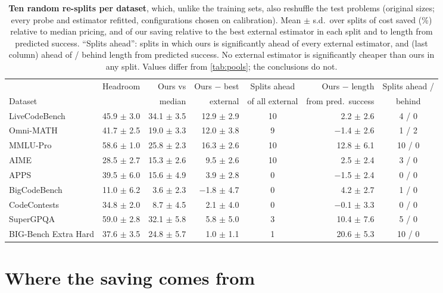 \documentclass[10pt]{article}
\begin{document}
\begin{table}[h]
\centering
\footnotesize
\setlength{\tabcolsep}{4pt}
\begin{tabular}{lrrrcrc}
\toprule
 & Headroom & Ours vs & Ours $-$ best & Splits ahead & Ours $-$ length & Splits ahead / \\
Dataset & & median & external & of all external & from pred.\ success & behind \\
\midrule
LiveCodeBench & 45.9 $\pm$ 3.0 & 34.1 $\pm$ 3.5 & 12.9 $\pm$ 2.9 & 10 & 2.2 $\pm$ 2.6 & 4 / 0 \\
Omni-MATH & 41.7 $\pm$ 2.5 & 19.0 $\pm$ 3.3 & 12.0 $\pm$ 3.8 & 9 & $-$1.4 $\pm$ 2.6 & 1 / 2 \\
MMLU-Pro & 58.6 $\pm$ 1.0 & 25.8 $\pm$ 2.3 & 16.3 $\pm$ 2.6 & 10 & 12.8 $\pm$ 6.1 & 10 / 0 \\
AIME & 28.5 $\pm$ 2.7 & 15.3 $\pm$ 2.6 & 9.5 $\pm$ 2.6 & 10 & 2.5 $\pm$ 2.4 & 3 / 0 \\
APPS & 39.5 $\pm$ 6.0 & 15.6 $\pm$ 4.9 & 3.9 $\pm$ 2.8 & 0 & $-$1.5 $\pm$ 2.4 & 0 / 0 \\
BigCodeBench & 11.0 $\pm$ 6.2 & 3.6 $\pm$ 2.3 & $-$1.8 $\pm$ 4.7 & 0 & 4.2 $\pm$ 2.7 & 1 / 0 \\
CodeContests & 34.8 $\pm$ 2.0 & 8.7 $\pm$ 4.5 & 2.1 $\pm$ 4.0 & 0 & $-$0.1 $\pm$ 3.3 & 0 / 0 \\
SuperGPQA & 59.0 $\pm$ 2.8 & 32.1 $\pm$ 5.8 & 5.8 $\pm$ 5.0 & 3 & 10.4 $\pm$ 7.6 & 5 / 0 \\
BIG-Bench Extra Hard & 37.6 $\pm$ 3.5 & 24.8 $\pm$ 5.7 & 1.0 $\pm$ 1.1 & 1 & 20.6 $\pm$ 5.3 & 10 / 0 \\
\bottomrule
\end{tabular}
\caption{\textbf{Ten random re-splits per dataset}, which, unlike the training sets, also reshuffle the test problems (original sizes; every probe and estimator refitted, configurations chosen on calibration). Mean $\pm$ s.d.\ over splits of cost saved (\%) relative to median pricing, and of our saving relative to the best external estimator in each split and to length from predicted success. ``Splits ahead'': splits in which ours is significantly ahead of every external estimator, and (last column) ahead of / behind length from predicted success. No external estimator is significantly cheaper than ours in any split. Values differ from \cref{tab:pools}; the conclusions do not.}
\label{tab:resplit}
\end{table}


\FloatBarrier
\section{Where the saving comes from}\label{app:subsets}
\end{document}
